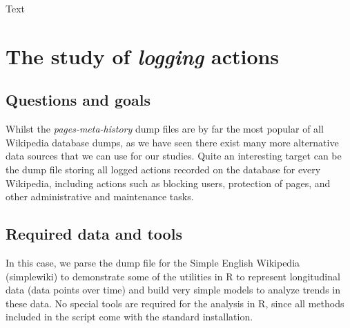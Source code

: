% 
% 
% 
% 
% 
Text

\chapter{The study of \textit{logging} actions}

\section{Questions and goals}
Whilst the \textit{pages-meta-history} dump files are by far the most popular of
all Wikipedia database dumps, as we have seen there exist many more alternative
data sources that we can use for our studies. Quite an interesting target can be
the dump file storing all logged actions recorded on the database for every
Wikipedia, including actions such as blocking users, protection of pages, and
other administrative and maintenance tasks.

\section{Required data and tools}
In this case, we parse the dump file for the Simple English Wikipedia (simplewiki)
to demonstrate some of the utilities in R to represent longitudinal data (data points
over time) and build very simple models to analyze trends in these data. No special
tools are required for the analysis in R, since all methods included in the script
come with the standard installation.

